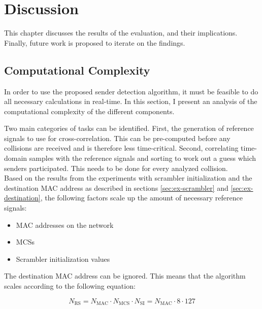 
\chapter{Discussion}\label{ch:Discussion}
\glsresetall %
 

This chapter discusses the results of the evaluation, and their implications. Finally, future work is proposed to iterate on the findings.



\section{Computational Complexity}\label{sec:complexity}

In order to use the proposed sender detection algorithm, it must be feasible to do all necessary calculations in real-time. In this section, I present an analysis of the computational complexity of the different components.

Two main categories of tasks can be identified. First, the generation of reference signals to use for cross-correlation. This can be pre-computed before any collisions are received and is therefore less time-critical. Second, correlating time-domain samples with the reference signals and sorting to work out a guess which senders participated. This needs to be done for every analyzed collision.\\

Based on the results from the experiments with scrambler initialization and the destination \gls{MAC} address as described in sections \ref{sec:ex-scrambler} and \ref{sec:ex-destination}, the following factors scale up the amount of necessary reference signals:

\begin{itemize}
  \item \gls{MAC} addresses on the network
  \item \glspl{MCS}
  \item Scrambler initialization values
\end{itemize}

The destination \gls{MAC} address can be ignored. This means that the algorithm scales according to the following equation:

$$ N_{\text{RS}} = N_{\text{MAC}} \cdot N_{\text{MCS}} \cdot N_{\text{SI}} = N_{\text{MAC}} \cdot 8 \cdot 127 $$\vspace{0cm}

